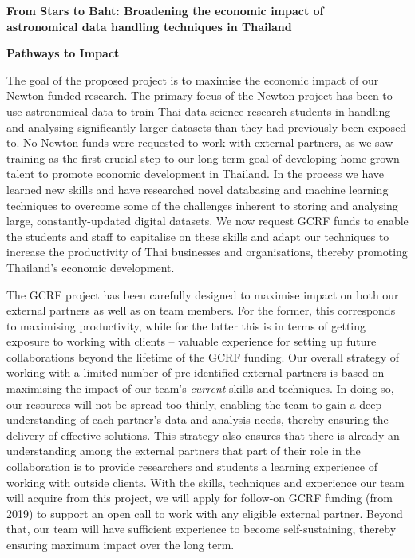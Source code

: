 \documentclass[11pt]{article}
\begin{document}
\setcounter{figure}{0}
\noindent
{\LARGE \bf From Stars to Baht: Broadening the economic impact of \\
astronomical data handling techniques in Thailand}

\vspace{3mm}
\noindent
{\LARGE \bf Pathways to Impact}

\vspace{3mm}
\noindent
The goal of the proposed project is to maximise the economic impact of our Newton-funded research. The primary focus of the Newton project has been to use astronomical data to train Thai data science research students in handling and analysing significantly larger datasets than they had previously been exposed to. No Newton funds were requested to work with external partners, as we saw training as the first crucial step to our long term goal of developing home-grown talent to promote economic development in Thailand. In the process we have learned new skills and have researched novel databasing and machine learning techniques to overcome some of the challenges inherent to storing and analysing large, constantly-updated digital datasets. We now request GCRF funds to enable the students and staff to capitalise on these skills and adapt our techniques to increase the productivity of Thai businesses and organisations, thereby promoting Thailand's economic development.  

\vspace{2mm}
\noindent
The GCRF project has been carefully designed to maximise impact on both our external partners as well as on team members. For the former, this corresponds to maximising productivity, while for the latter this is in terms of getting exposure to working with clients -- valuable experience for setting up future collaborations beyond the lifetime of the GCRF funding. Our overall strategy of working with a limited number of pre-identified external partners is based on maximising the impact of our team's {\it current} skills and techniques. In doing so, our resources will not be spread too thinly, enabling the team to gain a deep understanding of each partner's data and analysis needs, thereby ensuring the delivery of effective solutions. This strategy also ensures that there is already an understanding among the external partners that part of their role in the collaboration is to provide researchers and students a learning experience of working with outside clients. With the skills, techniques and experience our team will acquire from this project, we will apply for follow-on GCRF funding (from 2019) to support an open call to work with any eligible external partner. Beyond that, our team will have sufficient experience to become self-sustaining, thereby ensuring maximum impact over the long term.
\end{document}
